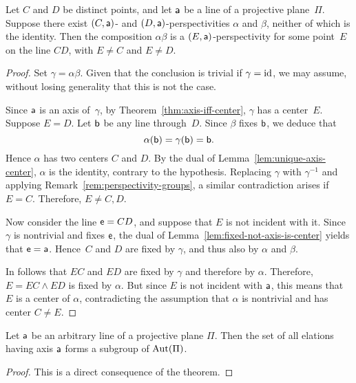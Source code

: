 \begin{thm}\label{thm:perspectivity-composition}
    Let\/ $C$ and\/ $D$ be distinct points, and let\/ $\mathsf a$ be a line of a projective plane\/~$\Pi$. Suppose there exist\/ $(C,\mathsf a)$- and\/ $(D,\mathsf a)$-perspectivities\/ $\alpha$ and\/ $\beta$, neither of which is the identity. Then the composition\/ $\alpha\beta$ is a\/ $(E, \mathsf a)$-perspectivity for some point\/~$E$ on the line\/ $CD$, with\/ $E\ne C$ and\/ $E\ne D$.
\end{thm}

\begin{proof}
    Set $\gamma = \alpha\beta$. Given that the conclusion is trivial if $\gamma=\operatorname{id}$, we may assume, without losing generality that this is not the case.
    
    Since $\mathsf a$ is an axis of~$\gamma$, by Theorem~\ref{thm:axis-iff-center}, $\gamma$ has a center~$E$. Suppose $E = D$. Let $\mathsf b$ be any line through~$D$. Since $\beta$ fixes $\mathsf b$, we deduce that
    \[
        \alpha(\mathsf b) = \gamma(\mathsf b) = \mathsf b.
    \]
    Hence $\alpha$ has two centers $C$ and $D$. By the dual of Lemma~\ref{lem:unique-axis-center}, $\alpha$ is the identity, contrary to the hypothesis. Replacing $\gamma$ with $\gamma^{-1}$ and applying Remark~\ref{rem:perspectivity-groups}, a similar contradiction arises if $E=C$. Therefore, $E\ne C,D$.

    Now consider the line $\mathsf e = CD$, and suppose that $E$ is not incident with it. Since $\gamma$ is nontrivial and fixes $\mathsf e$, the dual of Lemma~\ref{lem:fixed-not-axis-is-center} yields that $\mathsf e = \mathsf a$. Hence~$C$ and $D$ are fixed by $\gamma$, and thus also by $\alpha$ and $\beta$.

    In follows that $EC$ and $ED$ are fixed by $\gamma$ and therefore by $\alpha$. Therefore, $E = EC \wedge ED$ is fixed by $\alpha$. But since $E$ is not incident with $\mathsf a$, this means that $E$ is a center of $\alpha$, contradicting the assumption that $\alpha$ is nontrivial and has center $C\ne E$.
    
\end{proof}

\begin{cor}
    Let\/ $\mathsf a$ be an arbitrary line of a projective plane $\Pi$. Then the set of all elations having axis\/ $\mathsf a$ forms a subgroup of\/ $\operatorname{Aut}(\Pi)$.
\end{cor}

\begin{proof}
    This is a direct consequence of the theorem.
\end{proof}

